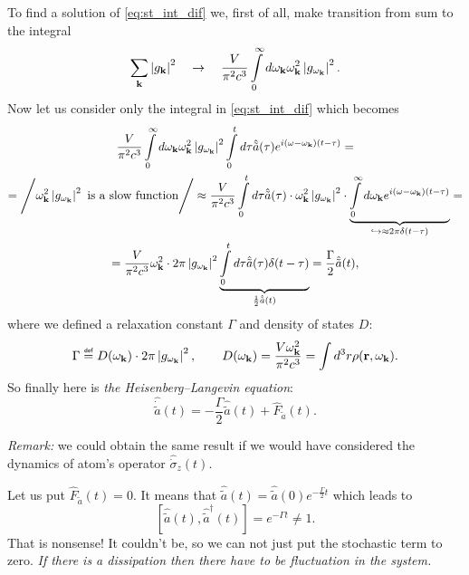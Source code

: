 To find a solution of \eqref{eq:st_int_dif} we, first of all, make transition from sum to the integral
\begin{equation}
	\sum_{\mathbf{k}} \left| g_{\mathbf{k}} \right|^2 \quad \to \quad \frac{V}{\pi^2 c^3} \int \limits_0^{\infty} d \omega_{\mathbf{k}} \omega_{\mathbf{k}}^2 \left| g_{\omega_{\mathbf{k}}} \right|^2.
\end{equation}
Now let us consider only the integral in \eqref{eq:st_int_dif} which becomes
\begin{multline}
	\frac{V}{\pi^2 c^3} \int \limits_0^{\infty} d \omega_{\mathbf{k}} \omega_{\mathbf{k}}^2 \left| g_{\omega_{\mathbf{k}}} \right|^2 \int \limits_0^t d\tau \hat{\tilde{a}}(\tau)e^{i(\omega - \omega_{\mathbf{k}})(t - \tau)} = \\ =\Bigg/ \omega_{\mathbf{k}}^2 \left| g_{\omega_{\mathbf{k}}} \right|^2 \text{ is a slow function} \Bigg/
	\approx \frac{V}{\pi^2 c^3} \int \limits_0^t d \tau \hat{\tilde{a}}(\tau) \cdot \omega_{\mathbf{k}}^2 \left| g_{\omega_{\mathbf{k}}} \right|^2 \cdot  \underbrace{\int \limits_0^{\infty} d \omega_{\mathbf{k}} e^{i(\omega - \omega_{\mathbf{k}})(t - \tau)}}_{\hookrightarrow\approx 2\pi \delta(t - \tau)} =\\= \frac{V}{\pi^2 c^3} \omega_{\mathbf{k}}^2 \cdot 2 \pi \left| g_{\omega_{\mathbf{k}}} \right|^2 \underbrace{\int \limits_0^t d\tau \hat{\tilde{a}}(\tau) \delta(t - \tau)}_{\frac{1}{2} \hat{\tilde{a}}(t)}  =\frac{\Gamma}{2}\hat{\tilde{a}}(t),
\end{multline}
where we defined a relaxation constant $\Gamma$ and density of states $D$:
\begin{equation}
	\Gamma \myeq D(\omega_{\kv}) \cdot 2 \pi \left| g_{\omega_{\kv}} \right|^2  , \qquad D(\omega_{\kv}) = \frac{V \omega_{\kv}^2}{\pi^2 c^3} = \int d^3 r \rho(\vec{r}, \omega_{\kv}).
\end{equation}
So finally here is \textit{the Heisenberg--Langevin equation}:
\begin{equation}
	\boxed{\hat{\dot{\tilde{a}}}(t) = - \frac{\Gamma}{2} \hat{\tilde{a}}(t) + \hat{F}_{\tilde{a}} (t). }
	\label{eq:HLeq}
\end{equation}

\textit{Remark:} we could obtain the same result if we would have considered the dynamics of atom's operator $\hat{\dot{\sigma}}_z(t)$.

\begin{testexample}
	Let us put $\hat{F}_{\tilde{a}} (t) = 0$. It means that $\hat{\tilde{a}}(t) = \hat{\tilde{a}}(0) e^{- \frac{\Gamma}{2} t}$ which leads to
	\begin{equation}
		\left[ \hat{\tilde{a}}(t), \hat{\tilde{a}}^{\dagger}(t) \right] = e^{- \Gamma t} \neq 1.
		\label{eq:example}
	\end{equation}
	That is nonsense! It couldn’t be, so we can not just put the stochastic term to zero. \textit{If there is a dissipation then there have to be fluctuation in the system.}
\end{testexample}

